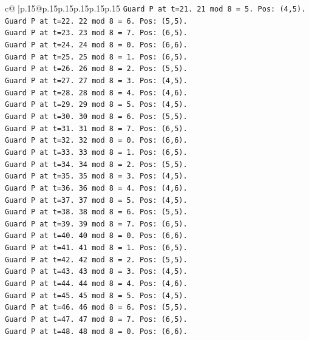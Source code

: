 \documentclass{article}
\begin{document}
{\begin{supertabular}{c@{$\;$}|p{.15\linewidth}@{}p{.15\linewidth}p{.15\linewidth}p{.15\linewidth}p{.15\linewidth}p{.15\linewidth}}
{{{\texttt{Guard P at t=21. 21 mod 8 = 5. Pos: (4,5).} \\
\texttt{Guard P at t=22. 22 mod 8 = 6. Pos: (5,5).} \\
\texttt{Guard P at t=23. 23 mod 8 = 7. Pos: (6,5).} \\
\texttt{Guard P at t=24. 24 mod 8 = 0. Pos: (6,6).} \\
\texttt{Guard P at t=25. 25 mod 8 = 1. Pos: (6,5).} \\
\texttt{Guard P at t=26. 26 mod 8 = 2. Pos: (5,5).} \\
\texttt{Guard P at t=27. 27 mod 8 = 3. Pos: (4,5).} \\
\texttt{Guard P at t=28. 28 mod 8 = 4. Pos: (4,6).} \\
\texttt{Guard P at t=29. 29 mod 8 = 5. Pos: (4,5).} \\
\texttt{Guard P at t=30. 30 mod 8 = 6. Pos: (5,5).} \\
\texttt{Guard P at t=31. 31 mod 8 = 7. Pos: (6,5).} \\
\texttt{Guard P at t=32. 32 mod 8 = 0. Pos: (6,6).} \\
\texttt{Guard P at t=33. 33 mod 8 = 1. Pos: (6,5).} \\
\texttt{Guard P at t=34. 34 mod 8 = 2. Pos: (5,5).} \\
\texttt{Guard P at t=35. 35 mod 8 = 3. Pos: (4,5).} \\
\texttt{Guard P at t=36. 36 mod 8 = 4. Pos: (4,6).} \\
\texttt{Guard P at t=37. 37 mod 8 = 5. Pos: (4,5).} \\
\texttt{Guard P at t=38. 38 mod 8 = 6. Pos: (5,5).} \\
\texttt{Guard P at t=39. 39 mod 8 = 7. Pos: (6,5).} \\
\texttt{Guard P at t=40. 40 mod 8 = 0. Pos: (6,6).} \\
\texttt{Guard P at t=41. 41 mod 8 = 1. Pos: (6,5).} \\
\texttt{Guard P at t=42. 42 mod 8 = 2. Pos: (5,5).} \\
\texttt{Guard P at t=43. 43 mod 8 = 3. Pos: (4,5).} \\
\texttt{Guard P at t=44. 44 mod 8 = 4. Pos: (4,6).} \\
\texttt{Guard P at t=45. 45 mod 8 = 5. Pos: (4,5).} \\
\texttt{Guard P at t=46. 46 mod 8 = 6. Pos: (5,5).} \\
\texttt{Guard P at t=47. 47 mod 8 = 7. Pos: (6,5).} \\
\texttt{Guard P at t=48. 48 mod 8 = 0. Pos: (6,6).} \\
}}}
\end{supertabular}}
\end{document}
